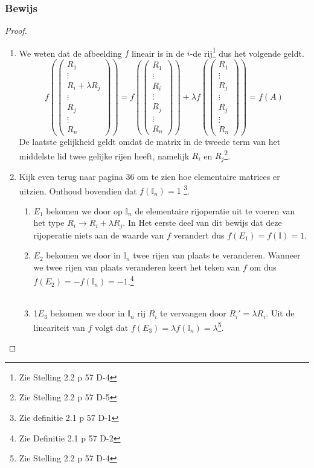 \documentclass[lineaire_algebra_oplossingen.tex]{subfiles}
\begin{document}
\subsubsection*{Bewijs}
\begin{proof}
\begin{enumerate}
\item We weten dat de afbeelding $f$ lineair is in de $i$-de rij\footnote{Zie Stelling 2.2 p 57 D-4} dus het volgende geldt.
\[
f
\left(
\begin{pmatrix}
R_1\\ \vdots\\R_i+\lambda R_j\\\vdots\\R_j\\\vdots\\R_n
\end{pmatrix}
\right)
=
f
\left(
\begin{pmatrix}
R_1\\ \vdots\\R_i\\\vdots\\R_j\\\vdots\\R_n
\end{pmatrix}
\right)
+
\lambda
f
\left(
\begin{pmatrix}
R_1\\ \vdots\\R_j\\\vdots\\R_j\\\vdots\\R_n
\end{pmatrix}
\right)
=
f(A)
\]
De laatste gelijkheid geldt omdat de matrix in de tweede term van het middelste lid twee gelijke rijen heeft, namelijk $R_i$ en $R_j$\footnote{Zie Stelling 2.2 p 57 D-5}.

\item
Kijk even terug naar pagina 36 om te zien hoe elementaire matrices er uitzien. Onthoud bovendien dat $f(\mathbb{I}_n)=1$ \footnote{Zie definitie 2.1 p 57 D-1}.
\begin{enumerate}
\item $E_1$ bekomen we door op $\mathbb{I}_n$ de elementaire rijoperatie uit te voeren van het type $R_i\rightarrow R_i + \lambda R_j$. In Het eerste deel van dit bewijs dat deze rijoperatie niets aan de waarde van $f$ verandert dus $f(E_1) = f(\mathbb{I}) = 1$.
\item $E_2$ bekomen we door in $\mathbb{I}_n$ twee rijen van plaats te veranderen. Wanneer we twee rijen van plaats veranderen keert het teken van $f$ om dus $f(E_2) = -f(\mathbb{I}_n) = -1$.\footnote{Zie Definitie 2.1 p 57 D-2}\\\\
\item 1$E_3$ bekomen we door in $\mathbb{I}_n$ rij $R_i$ te vervangen door $R_i' = \lambda R_i$. Uit de lineariteit van $f$ volgt dat $f(E_3) = \lambda f(\mathbb{I}_n) = \lambda$\footnote{Zie Stelling 2.2 p 57 D-4}.
\end{enumerate}


\end{enumerate}
\end{proof}
\end{document}
